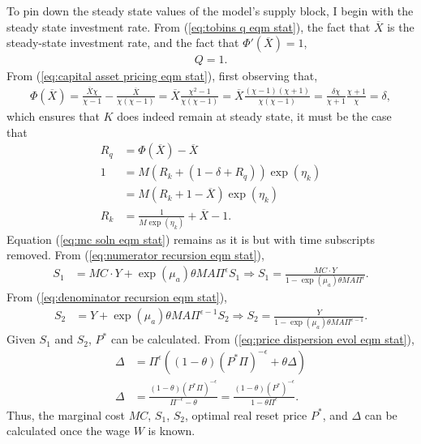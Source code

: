 \documentclass[12 pt, oneside]{article}
\theoremstyle{definition}
\theoremstyle{definition}
\theoremstyle{definition}
\begin{document}
To pin down the steady state values of the model's supply block, I begin with the steady state investment rate. From (\ref{eq:tobins q eqm stat}), the fact that $\overline{X}$ is the steady-state investment rate, and the fact that $\Phi'(\overline{X}) = 1$,
\begin{align*}
  Q = 1.
\end{align*}
From (\ref{eq:capital asset pricing eqm stat}),
 first observing that,
\begin{align*}
  \Phi(\overline{X}) = \frac{\overline{X}\chi}{\chi - 1} - \frac{\overline{X}}{\chi (\chi - 1)} = \overline{X}\frac{\chi^2 - 1}{\chi(\chi - 1)} = \overline{X}\frac{(\chi - 1)(\chi + 1)}{\chi (\chi - 1)} = \frac{\delta\chi}{\chi + 1}\frac{\chi + 1}{\chi} = \delta,
\end{align*}
which ensures that $K$ does indeed remain at steady state, it must be the case that
\begin{align*}
  R_q & =  \Phi(\overline{X}) - \overline{X}\\
  1 & = M(R_k + (1 - \delta + R_q))\exp(\eta_k)\\
      & = M(R_k + 1 - \overline{X}) \exp(\eta_k)\\
  R_k & = \frac{1}{M \exp(\eta_k)} + \overline{X} - 1.
\end{align*}
Equation (\ref{eq:mc soln eqm stat}) remains as it is but with time subscripts removed. From (\ref{eq:numerator recursion eqm stat}),
\begin{align*}
  S_1 & = MC \cdot Y + \exp(\mu_a)\theta M A \Pi^\epsilon S_1 \Rightarrow S_1 = \frac{MC\cdot Y}{1 - \exp(\mu_a)\theta M A \Pi^\epsilon}.
\end{align*}
From (\ref{eq:denominator recursion eqm stat}),
\begin{align*}
  S_2 & = Y + \exp(\mu_a)\theta M A \Pi^{\epsilon - 1}S_2 \Rightarrow S_2 = \frac{Y}{1 - \exp(\mu_a)\theta M A \Pi^{\epsilon - 1}}.
\end{align*}
Given $S_1$ and $S_2$, $P^*$ can be calculated.
From (\ref{eq:price dispersion evol eqm stat}),
\begin{align*}
  \Delta & = \Pi^\epsilon\left((1 - \theta)(P^* \Pi)^{-\epsilon} + \theta \Delta\right)\\
  \Delta & = \frac{(1 - \theta)(P^* \Pi)^{-\epsilon}}{\Pi^{-\epsilon} - \theta} = \frac{(1- \theta)(P^*)^{-\epsilon}}{1 - \theta \Pi^{\epsilon}}.
\end{align*}
Thus, the marginal cost $MC$, $S_1$, $S_2$, optimal real reset price $P^*$, and $\Delta$ can be calculated once the wage $W$ is known.
\end{document}
